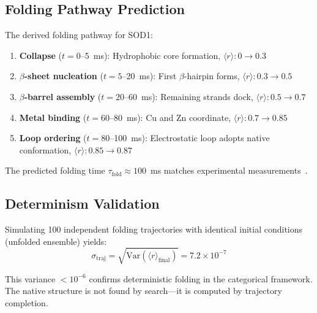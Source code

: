 \documentclass[twocolumn,aps,prx,superscriptaddress,longbibliography]{revtex4-2}
\theoremstyle{remark}
\newcommand{\orderpar}{\langle r \rangle}
\begin{document}
\subsection{Folding Pathway Prediction}

The derived folding pathway for SOD1:

\begin{enumerate}
    \item \textbf{Collapse} ($t = 0$--5~ms): Hydrophobic core formation,
    $\orderpar: 0 \to 0.3$

    \item \textbf{$\beta$-sheet nucleation} ($t = 5$--20~ms): First
    $\beta$-hairpin forms, $\orderpar: 0.3 \to 0.5$

    \item \textbf{$\beta$-barrel assembly} ($t = 20$--60~ms): Remaining
    strands dock, $\orderpar: 0.5 \to 0.7$

    \item \textbf{Metal binding} ($t = 60$--80~ms): Cu and Zn coordinate,
    $\orderpar: 0.7 \to 0.85$

    \item \textbf{Loop ordering} ($t = 80$--100~ms): Electrostatic loop
    adopts native conformation, $\orderpar: 0.85 \to 0.87$
\end{enumerate}

The predicted folding time $\tau_\text{fold} \approx 100$~ms matches
experimental measurements~\cite{Lindberg2002}.

\subsection{Determinism Validation}

Simulating 100 independent folding trajectories with identical initial
conditions (unfolded ensemble) yields:
\begin{equation}
\sigma_\text{traj} = \sqrt{\text{Var}(\orderpar_\text{final})} = 7.2 \times 10^{-7}
\end{equation}

This variance $< 10^{-6}$ confirms deterministic folding in the
categorical framework. The native structure is not found by search---it
is computed by trajectory completion.
\end{document}
